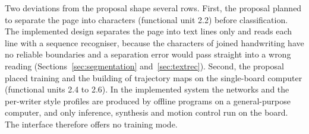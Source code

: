 Two deviations from the proposal shape several rows.
First, the proposal planned to separate the page into characters (functional unit 2.2) before classification. The implemented design separates the page into text lines only and reads each line with a sequence recogniser, because the characters of joined handwriting have no reliable boundaries and a separation error would pass straight into a wrong reading (Sections~\ref{sec:segmentation} and~\ref{sec:textrec}).
Second, the proposal placed training and the building of trajectory maps on the single-board computer (functional units 2.4 to 2.6). In the implemented system the networks and the per-writer style profiles are produced by offline programs on a general-purpose computer, and only inference, synthesis and motion control run on the board. The interface therefore offers no training mode.

